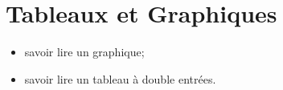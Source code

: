 \chapter{Tableaux et Graphiques}\label{ChTableauxGraphiques}


\vspace{5cm}

\begin{acquis}
\begin{itemize}
\item savoir lire un graphique;
\item savoir lire un tableau à double entrées.
\end{itemize}
\end{acquis}


\activites



\cours
%

\exercicesbase
\begin{colonne*exercice}

\end{colonne*exercice}


\exercicesappr
\begin{colonne*exercice}

\end{colonne*exercice}

\connaissances


\TravauxPratiques %


\pagebreak

\recreation



